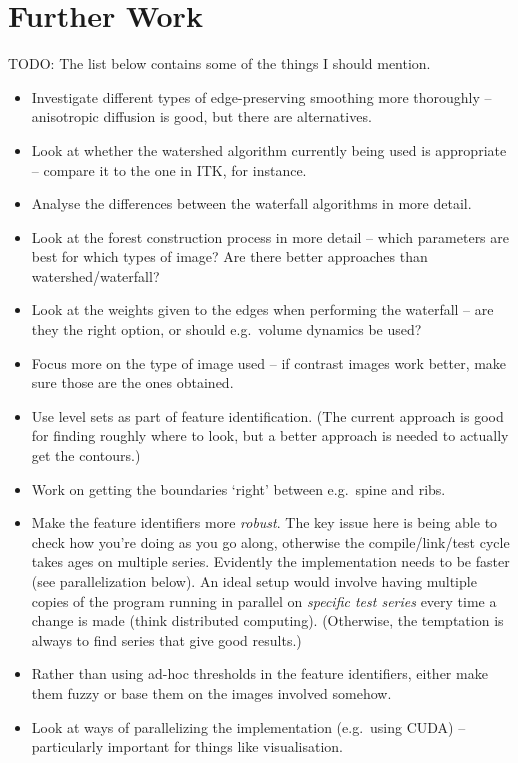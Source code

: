 \newpage

\section{Further Work}
\label{sec:conclusions-furtherwork}

\iffalse

TODO: The list below contains some of the things I should mention.
%
\begin{itemize}
\item Investigate different types of edge-preserving smoothing more thoroughly -- anisotropic diffusion is good, but there are alternatives.
\item Look at whether the watershed algorithm currently being used is appropriate -- compare it to the one in ITK, for instance.
\item Analyse the differences between the waterfall algorithms in more detail.
\item Look at the forest construction process in more detail -- which parameters are best for which types of image? Are there better approaches than watershed/waterfall?
\item Look at the weights given to the edges when performing the waterfall -- are they the right option, or should e.g.~volume dynamics be used?
\item Focus more on the type of image used -- if contrast images work better, make sure those are the ones obtained.
\item Use level sets as part of feature identification. (The current approach is good for finding roughly where to look, but a better approach is needed to actually get the contours.)
\item Work on getting the boundaries `right' between e.g.~spine and ribs.
\item Make the feature identifiers more \emph{robust}. The key issue here is being able to check how you're doing as you go along, otherwise the compile/link/test cycle takes ages on multiple series. Evidently the implementation needs to be faster (see parallelization below). An ideal setup would involve having multiple copies of the program running in parallel on \emph{specific test series} every time a change is made (think distributed computing). (Otherwise, the temptation is always to find series that give good results.)
\item Rather than using ad-hoc thresholds in the feature identifiers, either make them fuzzy or base them on the images involved somehow.
\item Look at ways of parallelizing the implementation (e.g.~using CUDA) -- particularly important for things like visualisation.
\end{itemize}

